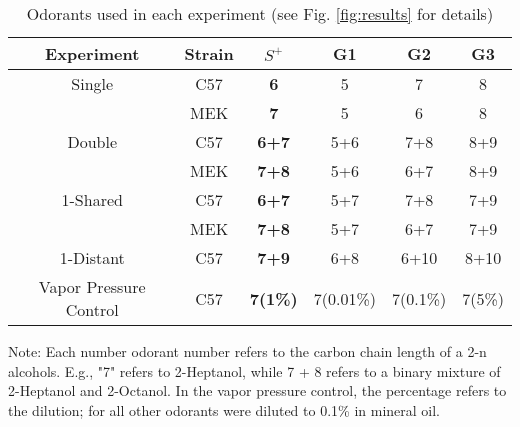 \begin{table}
\label{tab:design}
    \begin{tabular}{ c | c | c | c | c | c }
        Experiment & Strain & \textbf{$S^+$} & G1 & G2 & G3 \\ 
        \hline
        Single & C57 & \textbf{6} & 5 & 7 & 8 \\ 
         & MEK & \textbf{7} & 5 & 6 & 8 \\ 
        \hline
        Double & C57 & \textbf{6+7} & 5+6 & 7+8 & 8+9 \\ 
         & MEK & \textbf{7+8} & 5+6 & 6+7 & 8+9 \\ 
        \hline
        1-Shared & C57 & \textbf{6+7} & 5+7 & 7+8 & 7+9 \\ 
         & MEK & \textbf{7+8} & 5+7 & 6+7 & 7+9 \\ 
        \hline
        1-Distant & C57 & \textbf{7+9} & 6+8 & 6+10 & 8+10 \\ 
        \hline
        Vapor Pressure Control & C57 & \textbf{7(1\%)} & 7(0.01\%) & 7(0.1\%) & 7(5\%) \\ 
    \end{tabular}
    \caption{Odorants used in each experiment (see Fig. \ref{fig:results} for details)}
\end{table}
Note: Each number odorant number refers to the carbon chain length of a 2-n alcohols. E.g., "7" refers to 2-Heptanol, while 7 + 8 refers to a binary mixture of 2-Heptanol and 2-Octanol. In the vapor pressure control, the percentage refers to the dilution; for all other odorants were diluted to {0.1\%} in mineral oil.